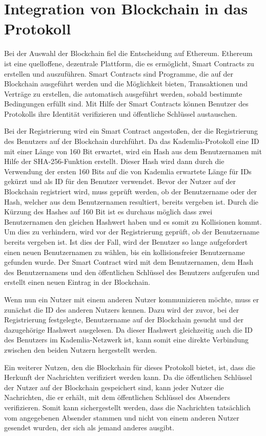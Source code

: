 \section{Integration von Blockchain in das Protokoll}
\label{sec:blockchainintegration}

Bei der Auswahl der Blockchain fiel die Entscheidung auf Ethereum. Ethereum ist eine quelloffene,
dezentrale Plattform, die es ermöglicht, Smart Contracts zu erstellen und auszuführen. Smart Contracts sind Programme, die auf der Blockchain ausgeführt werden und die Möglichkeit bieten, Transaktionen und Verträge zu erstellen, die automatisch ausgeführt werden, sobald bestimmte Bedingungen erfüllt sind. Mit Hilfe der Smart Contracts können Benutzer des Protokolls ihre Identität verifizieren und öffentliche Schlüssel austauschen. 


Bei der Registrierung wird ein Smart Contract angestoßen, der die Registrierung des Benutzers auf der Blockchain durchführt. Da das Kademlia-Protokoll eine ID mit einer Länge von 160 Bit erwartet, wird ein Hash aus dem Benutzernamen mit Hilfe der SHA-256-Funktion erstellt. Dieser Hash wird dann durch die Verwendung der ersten 160 Bits auf die von Kademlia erwartete Länge für IDs gekürzt und als ID für den Benutzer verwendet. Bevor der Nutzer auf der Blockchain registriert wird, muss geprüft werden, ob der Benutzername oder der Hash, welcher aus dem Benutzernamen resultiert, bereits vergeben ist. Durch die Kürzung des Hashes auf 160 Bit ist es durchaus möglich dass zwei Benutzernamen den gleichen Hashwert haben und es somit zu Kollisionen kommt. Um dies zu verhindern, wird vor der Registrierung geprüft, ob der Benutzername bereits vergeben ist. Ist dies der Fall, wird der Benutzer so lange aufgefordert einen neuen Benutzernamen zu wählen, bis ein kollisionsfreier Benutzername gefunden wurde. Der Smart Contract wird mit dem Benutzernamen, dem Hash des Benutzernamens und den öffentlichen Schlüssel des Benutzers aufgerufen und erstellt einen neuen Eintrag in der Blockchain.

Wenn nun ein Nutzer mit einem anderen Nutzer kommunizieren möchte, muss er zunächst die ID des anderen Nutzers kennen. Dazu wird der zuvor, bei der Registrierung festgelegte, Benutzername auf der Blockchain gesucht und der dazugehörige Hashwert ausgelesen. Da dieser Hashwert gleichzeitig auch die ID des Benutzers im Kademlia-Netzwerk ist, kann somit eine direkte Verbindung zwischen den beiden Nutzern hergestellt werden.

Ein weiterer Nutzen, den die Blockchain für dieses Protokoll bietet, ist, dass die Herkunft der Nachrichten verifiziert werden kann. Da die öffentlichen Schlüssel der Nutzer auf der Blockchain gespeichert sind, kann jeder Nutzer die Nachrichten, die er erhält, mit dem öffentlichen Schlüssel des Absenders verifizieren. Somit kann sichergestellt werden, dass die Nachrichten tatsächlich vom angegebenen Absender stammen und nicht von einem anderen Nutzer gesendet wurden, der sich als jemand anderes ausgibt.



